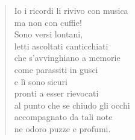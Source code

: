 \begin{verse}
Io i ricordi li rivivo con musica\\
ma non con cuffie!\\
Sono versi lontani,\\
letti ascoltati canticchiati\\
che s'avvinghiano a memorie\\
come parassiti in gusci\\
e lì sono sicuri\\
pronti a esser rievocati\\
al punto che se chiudo gli occhi\\
accompagnato da tali note\\
ne odoro puzze e profumi.

\end{verse}